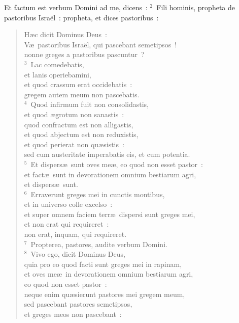 \bchapter
\lettrine[lines=3,image=true,loversize=0.05,lraise=-0.03]{E}{}t factum est verbum Domini ad me, dicens~:
${}^{2}$~Fili hominis, propheta de pastoribus Isra\"el~: propheta, et dices pastoribus~: \begin{flushleft}\begin{verse}H\ae c dicit Dominus Deus~:\\ V\ae\ pastoribus Isra\"el, qui pascebant semetipsos~!\\ nonne greges a pastoribus pascuntur~?\\
${}^{3}$~Lac comedebatis,\\ et lanis operiebamini,\\ et quod crassum erat occidebatis~:\\ gregem autem meum non pascebatis.\\
${}^{4}$~Quod infirmum fuit non consolidastis,\\ et quod \ae grotum non sanastis~:\\ quod confractum est non alligastis,\\ et quod abjectum est non reduxistis,\\ et quod perierat non qu\ae sistis~:\\ sed cum austeritate imperabatis eis, et cum potentia.\\
${}^{5}$~Et dispers\ae\ sunt oves me\ae , eo quod non esset pastor~:\\ et fact\ae\ sunt in devorationem omnium bestiarum agri,\\ et dispers\ae\ sunt.\\
${}^{6}$~Erraverunt greges mei in cunctis montibus,\\ et in universo colle excelso~:\\ et super omnem faciem terr\ae\ dispersi sunt greges mei,\\ et non erat qui requireret~:\\ non erat, inquam, qui requireret.\\
${}^{7}$~Propterea, pastores, audite verbum Domini.\\
${}^{8}$~Vivo ego, dicit Dominus Deus,\\ quia pro eo quod facti sunt greges mei in rapinam,\\ et oves me\ae\ in devorationem omnium bestiarum agri,\\ eo quod non esset pastor~:\\ neque enim qu\ae sierunt pastores mei gregem meum,\\ sed pascebant pastores semetipsos,\\ et greges meos non pascebant~:\\

\end{verse}
\end{flushleft}
